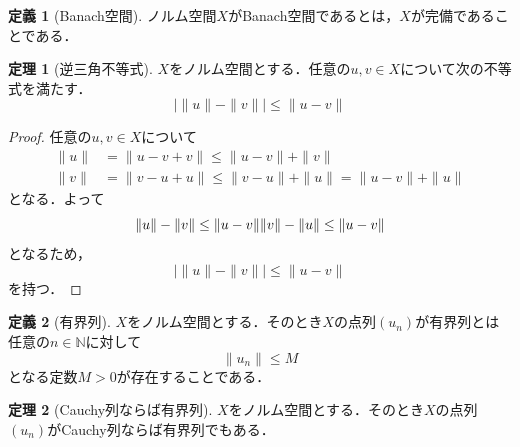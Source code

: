\documentclass[11pt,a4paper,titlepage]{jsreport}
\theoremstyle{definition}
\newtheorem{dfn}{定義}
\newtheorem{thm}{定理}
\begin{document}
\begin{dfn}[Banach空間]
  ノルム空間$X$がBanach空間であるとは，$X$が完備であることである．
\end{dfn}

\begin{thm}[逆三角不等式]
  \label{thm1}
  $X$をノルム空間とする．任意の$u,v\in X$について次の不等式を満たす．
  \begin{equation*}
    |\|u\|-\|v\||\leq\|u-v\|
  \end{equation*}
\end{thm}

\begin{proof}
  任意の$u,v\in X$について
  \begin{align*}
    \|u\| & =\|u-v+v\|\leq\|u-v\|+\|v\|               \\
    \|v\| & =\|v-u+u\|\leq\|v-u\|+\|u\|=\|u-v\|+\|u\|
  \end{align*}
  となる．よって
  \begin{equation*}
    \|u\|-\|v\|\leq\|u-v\| \\
    \|v\|-\|u\|\leq\|u-v\|
  \end{equation*}
  となるため，
  \begin{equation*}
    |\|u\|-\|v\||\leq\|u-v\|
  \end{equation*}
  を持つ．
\end{proof}

\begin{dfn}[有界列]
  $X$をノルム空間とする．そのとき$X$の点列$(u_n)$が有界列とは任意の$n\in\mathbb{N}$に対して
  \begin{equation*}
    \|u_n\|\leq M
  \end{equation*}
  となる定数$M>0$が存在することである．
\end{dfn}

\begin{thm}[Cauchy列ならば有界列]
  $X$をノルム空間とする．そのとき$X$の点列$(u_n)$がCauchy列ならば有界列でもある．
\end{thm}
\end{document}
